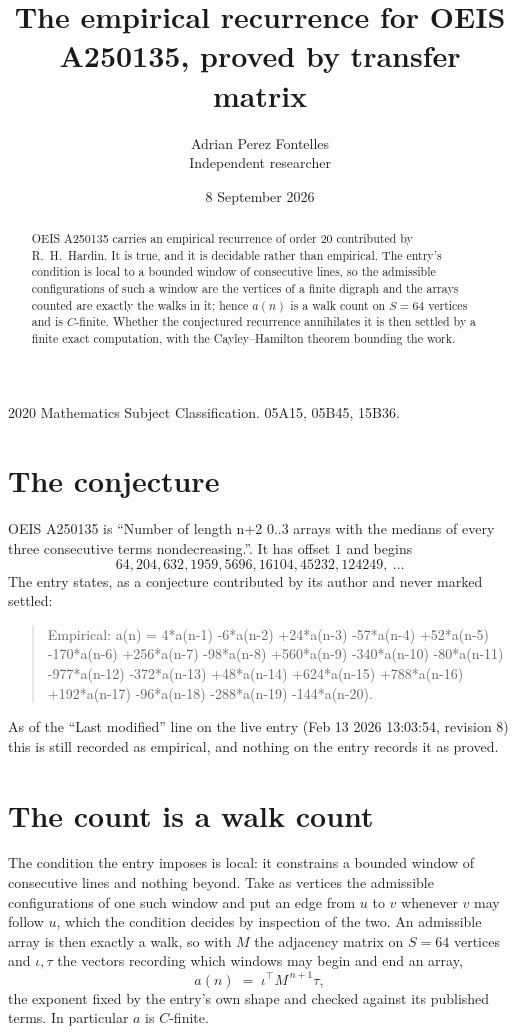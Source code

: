 \documentclass[11pt,a4paper]{article}
\title{The empirical recurrence for OEIS A250135, proved by transfer matrix}
\author{Adrian Perez Fontelles\\ \small Independent researcher}
\date{8 September 2026}
\theoremstyle{plain}
\theoremstyle{definition}
\begin{document}
\maketitle

\begin{abstract}
OEIS A250135 carries an empirical recurrence of order $20$ contributed by R.~H.~Hardin. It is
true, and it is decidable rather than empirical. The entry's condition is local to a bounded window of consecutive lines, so
the admissible configurations of such a window are the vertices of a finite digraph and the
arrays counted are exactly the walks in it; hence $a(n)$ is a walk count on $S=64$ vertices
and is $C$-finite. Whether the conjectured recurrence annihilates it is then settled by a
finite exact computation, with the Cayley--Hamilton theorem bounding the work.
\end{abstract}

\noindent\small 2020 Mathematics Subject Classification. 05A15, 05B45, 15B36.\normalsize

\section{The conjecture}

OEIS A250135 is ``Number of length n+2 0..3 arrays with the medians of every three consecutive terms nondecreasing.''. It has offset $1$ and begins
\[
64, 204, 632, 1959, 5696, 16104, 45232, 124249,\ \dots
\]
The entry states, as a conjecture contributed by its author and never marked settled:
\begin{quote}
Empirical: a(n) = 4*a(n-1) -6*a(n-2) +24*a(n-3) -57*a(n-4) +52*a(n-5) -170*a(n-6) +256*a(n-7) -98*a(n-8) +560*a(n-9) -340*a(n-10) -80*a(n-11) -977*a(n-12) -372*a(n-13) +48*a(n-14) +624*a(n-15) +788*a(n-16) +192*a(n-17) -96*a(n-18) -288*a(n-19) -144*a(n-20).
\end{quote}
As of the ``Last modified'' line on the live entry (Feb 13 2026 13:03:54, revision 8) this is still
recorded as empirical, and nothing on the entry records it as proved.

\section{The count is a walk count}

The condition the entry imposes is local: it constrains a bounded window of consecutive lines and nothing beyond. Take as
vertices the admissible configurations of one such window and put an edge from $u$ to $v$
whenever $v$ may follow $u$, which the condition decides by inspection of the two. An
admissible array is then exactly a walk, so with $M$ the adjacency matrix on $S=64$ vertices
and $\iota,\tau$ the vectors recording which windows may begin and end an array,
\[
a(n)\;=\;\iota^{\!\top}M^{\,n+1}\tau ,
\]
the exponent fixed by the entry's own shape and checked against its published terms. In
particular $a$ is $C$-finite.
\end{document}

